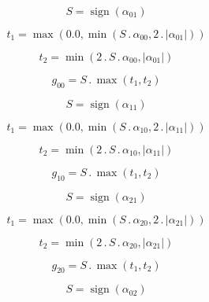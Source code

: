 \documentclass{article}
\begin{document}
\begin{dmath}S = \operatorname{sign}{\left (\alpha_{01} \right )}\end{dmath}

\begin{dmath}t_{1} = \max\left(0.0, \min\left(S \,.\, \alpha_{00}, 2 \,.\, \left|{\alpha_{01}}\right|\right)\right)\end{dmath}

\begin{dmath}t_{2} = \min\left(2 \,.\, S \,.\, \alpha_{00}, \left|{\alpha_{01}}\right|\right)\end{dmath}

\begin{dmath}g_{00} = S \,.\, \max\left(t_{1}, t_{2}\right)\end{dmath}

\begin{dmath}S = \operatorname{sign}{\left (\alpha_{11} \right )}\end{dmath}

\begin{dmath}t_{1} = \max\left(0.0, \min\left(S \,.\, \alpha_{10}, 2 \,.\, \left|{\alpha_{11}}\right|\right)\right)\end{dmath}

\begin{dmath}t_{2} = \min\left(2 \,.\, S \,.\, \alpha_{10}, \left|{\alpha_{11}}\right|\right)\end{dmath}

\begin{dmath}g_{10} = S \,.\, \max\left(t_{1}, t_{2}\right)\end{dmath}

\begin{dmath}S = \operatorname{sign}{\left (\alpha_{21} \right )}\end{dmath}

\begin{dmath}t_{1} = \max\left(0.0, \min\left(S \,.\, \alpha_{20}, 2 \,.\, \left|{\alpha_{21}}\right|\right)\right)\end{dmath}

\begin{dmath}t_{2} = \min\left(2 \,.\, S \,.\, \alpha_{20}, \left|{\alpha_{21}}\right|\right)\end{dmath}

\begin{dmath}g_{20} = S \,.\, \max\left(t_{1}, t_{2}\right)\end{dmath}

\begin{dmath}S = \operatorname{sign}{\left (\alpha_{02} \right )}\end{dmath}
\end{document}

